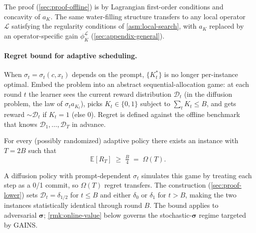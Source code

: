 The proof (\cref{sec:proof-offline}) is by Lagrangian first-order conditions and concavity of $a_K$. The same water-filling structure transfers to any local operator $\mathcal L$ satisfying the regularity conditions of \cref{asm:local-search}, with $a_K$ replaced by an operator-specific gain $\phi_K^{\mathcal L}$ (\cref{sec:appendix-general}).

\paragraph{Regret bound for adaptive scheduling.}
When $\sigma_t = \sigma_t(c, x_t)$ depends on the prompt, $\{K_t^*\}$ is no longer per-instance optimal. Embed the problem into an abstract sequential-allocation game: at each round $t$ the learner sees the current reward distribution $\mathcal{D}_t$ (in the diffusion problem, the law of $\sigma_t a_{K_t}$), picks $K_t \in \{0,1\}$ subject to $\sum_t K_t \le B$, and gets reward $\sim\mathcal{D}_t$ if $K_t = 1$ (else $0$). Regret is defined against the offline benchmark that knows $\mathcal{D}_1,\ldots,\mathcal{D}_T$ in advance.

\begin{lemma}
\label{lem:lower}
For every (possibly randomized) adaptive policy there exists an instance with $T = 2B$ such that
\begin{equation}
  \mathbb{E}[R_T] \;\ge\; \tfrac{B}{4} \;=\; \Omega(T).
  \label{eq:lower}
\end{equation}
\end{lemma}

A diffusion policy with prompt-dependent $\sigma_t$ simulates this game by treating each step as a 0/1 commit, so $\Omega(T)$ regret transfers. The construction (\cref{sec:proof-lower}) sets $\mathcal{D}_t = \delta_{1/2}$ for $t \le B$ and either $\delta_0$ or $\delta_1$ for $t > B$, making the two instances statistically identical through round $B$. The bound applies to adversarial $\boldsymbol\sigma$; \cref{rmk:online-value} below governs the stochastic-$\boldsymbol\sigma$ regime targeted by \textsc{GAINS}.

